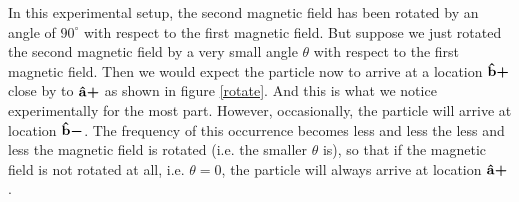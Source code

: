  In this experimental setup, the second magnetic field has been rotated by an angle of $90^\circ$ with respect to the first magnetic field. But suppose we just rotated the second magnetic field by a very small angle $\theta$ with respect to the first magnetic field. Then we would expect the particle now to arrive at a location  $\vb{\hat{{b}}}\bm{+}$ close by to $\vb{\hat{{a}}}\bm{+}$ as shown in figure \ref{rotate}. And this is what we notice experimentally for the most part. However, occasionally, the particle will arrive at location $\vb{\hat{{b}}}\bm{-}$. The frequency of this occurrence becomes less and less the less and less the magnetic field is rotated (i.e. the smaller $\theta$ is), so that if the magnetic field is not rotated at all, i.e. $\theta=0$, the particle will always arrive at location $\vb{\hat{{a}}}\bm{+}$. 
